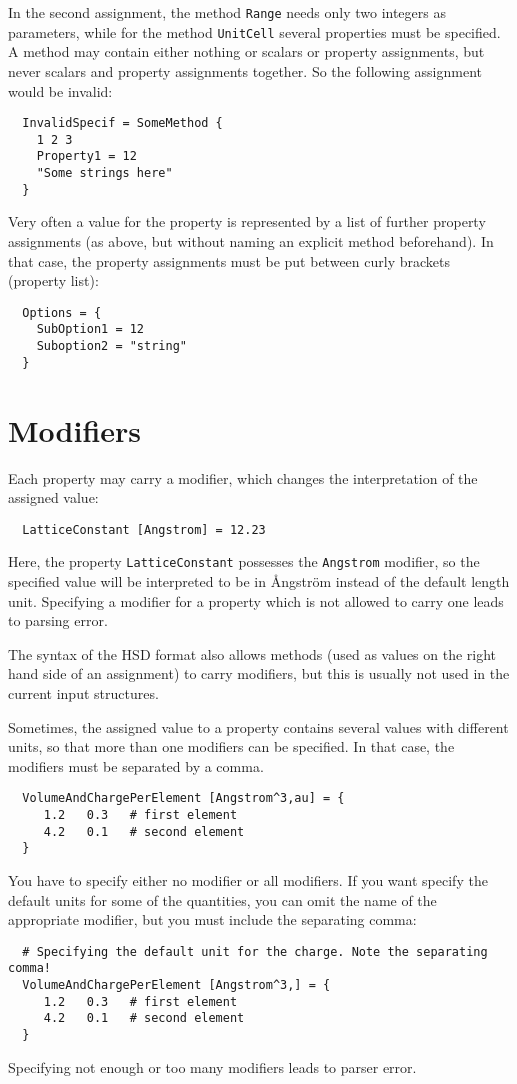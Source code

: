 In the second assignment, the method \verb|Range| needs only two
integers as parameters, while for the method \verb|UnitCell| several
properties must be specified. A method may contain either nothing or
scalars or property assignments, but never scalars and property
assignments together. So the following assignment would be invalid:
\begin{verbatim}
  InvalidSpecif = SomeMethod {
    1 2 3
    Property1 = 12
    "Some strings here"
  }
\end{verbatim}

Very often a value for the property is represented by a list of
further property assignments (as above, but without naming an
explicit method beforehand). In that case, the property assignments must
be put between curly brackets (property list):
\begin{verbatim}
  Options = {
    SubOption1 = 12
    Suboption2 = "string"
  }
\end{verbatim}


\section{Modifiers}

Each property may carry a modifier, which changes the interpretation
of the assigned value:
\begin{verbatim}
  LatticeConstant [Angstrom] = 12.23
\end{verbatim}
Here, the property \verb|LatticeConstant| possesses the \verb|Angstrom|
modifier, so the specified value will be interpreted to be in
\AA{}ngstr\"om instead of the default length unit. Specifying a modifier
for a property which is not allowed to carry one leads to parsing error.

The syntax of the HSD format also allows methods (used as values on the right
hand side of an assignment) to carry modifiers, but this is usually not used in
the current input structures.

Sometimes, the assigned value to a property contains several values
with different units, so that more than one modifiers can be
specified. In that case, the modifiers must be separated by a comma.
\begin{verbatim}
  VolumeAndChargePerElement [Angstrom^3,au] = {
     1.2   0.3   # first element
     4.2   0.1   # second element
  }
\end{verbatim}
You have to specify either no modifier or all modifiers. If you want
specify the default units for some of the quantities, you can omit the
name of the appropriate modifier, but you must include the separating
comma:
\begin{verbatim}
  # Specifying the default unit for the charge. Note the separating comma!
  VolumeAndChargePerElement [Angstrom^3,] = {
     1.2   0.3   # first element
     4.2   0.1   # second element
  }
\end{verbatim}
Specifying not enough or too many modifiers leads to parser error.

